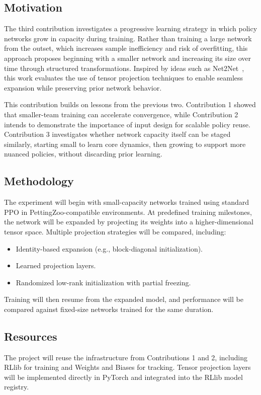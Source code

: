 
\subsection{Motivation}
The third contribution investigates a progressive learning strategy in which policy 
networks grow in capacity during training. Rather than training a large network 
from the outset, which increases sample inefficiency and risk of overfitting, 
this approach proposes beginning with a smaller network and increasing its size over 
time through structured transformations. Inspired by ideas such as Net2Net~\cite{chen2016}, 
this work evaluates the use of tensor projection techniques to enable seamless 
expansion while preserving prior network behavior.

This contribution builds on lessons from the previous two. Contribution 1 
showed that smaller-team training can accelerate convergence, while Contribution 2 
intends to demonstrate the importance of input design for scalable policy reuse. 
Contribution 3 investigates whether network capacity itself can be staged similarly,
starting small to learn core dynamics, then growing to support more nuanced policies,
without discarding prior learning.

\subsection{Methodology}
The experiment will begin with small-capacity networks trained using standard 
PPO in PettingZoo-compatible environments. At predefined training milestones, 
the network will be expanded by projecting its weights into a higher-dimensional tensor space. 
Multiple projection strategies will be compared, including:
\begin{itemize}
    \item Identity-based expansion (e.g., block-diagonal initialization).
    \item Learned projection layers.
    \item Randomized low-rank initialization with partial freezing.
\end{itemize}
Training will then resume from the expanded model, and performance will 
be compared against fixed-size networks trained for the same duration.

\subsection{Resources}
The project will reuse the infrastructure from Contributions 1 and 2, 
including RLlib for training and Weights and Biases for tracking. 
Tensor projection layers will be implemented directly in PyTorch and 
integrated into the RLlib model registry.

